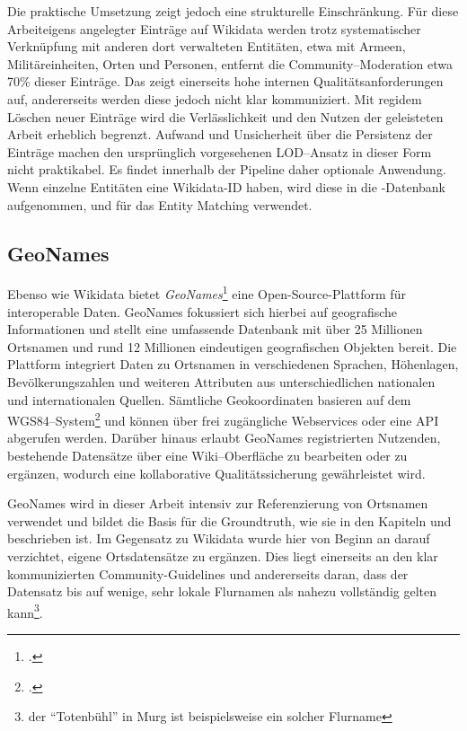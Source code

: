 \documentclass[12pt, a4paper, ngerman, bidi=default]{article}
\let\cite\footcite
\begin{document}
Die praktische Umsetzung zeigt jedoch eine strukturelle Einschränkung. Für diese Arbeiteigens angelegter Einträge auf Wikidata werden
trotz systematischer Verknüpfung mit anderen dort verwalteten Entitäten, etwa mit Armeen, Militäreinheiten, Orten und Personen, entfernt die Community–Moderation etwa 70\% dieser Einträge. 
Das zeigt einerseits hohe internen Qualitätsanforderungen auf, andererseits werden diese jedoch nicht klar kommuniziert. Mit regidem Löschen neuer Einträge wird die Verlässlichkeit und den Nutzen der 
geleisteten Arbeit erheblich begrenzt. 
Aufwand und Unsicherheit über die Persistenz der Einträge machen den ursprünglich vorgesehenen LOD–Ansatz in dieser Form nicht praktikabel. Es findet innerhalb der Pipeline daher optionale Anwendung. Wenn einzelne Entitäten eine Wikidata-ID haben, wird diese in die -Datenbank aufgenommen, und für das Entity Matching verwendet.

\subsection{GeoNames}\label{subsec:geonames}

Ebenso wie Wikidata bietet \textit{GeoNames}\cite[vgl.][]{noauthor_geonames_nodate} eine Open-Source-Plattform für interoperable Daten. GeoNames fokussiert sich hierbei auf geografische Informationen 
und stellt eine umfassende Datenbank mit über 25 Millionen Ortsnamen und rund 12 Millionen eindeutigen geografischen Objekten bereit.  
Die Plattform integriert Daten zu 
Ortsnamen in verschiedenen Sprachen, Höhenlagen, Bevölkerungszahlen und weiteren Attributen aus unterschiedlichen nationalen und internationalen Quellen.  
Sämtliche Geokoordinaten basieren auf dem WGS84–System\cite[\textit{WGS84: geodätische Grundlage des Global Positioning System (GPS)} ;vgl.][]{noauthor_wgs84_nodate}
und können über frei zugängliche Webservices oder eine API abgerufen werden.  
Darüber hinaus erlaubt GeoNames registrierten Nutzenden, bestehende Datensätze über eine Wiki–Oberfläche zu bearbeiten oder zu ergänzen, wodurch eine 
kollaborative Qualitätssicherung gewährleistet wird.

GeoNames wird in dieser Arbeit intensiv zur Referenzierung von Ortsnamen verwendet und bildet die Basis für die Groundtruth, wie sie in den Kapiteln  und 
 beschrieben ist. Im Gegensatz zu Wikidata wurde hier von Beginn an darauf verzichtet, eigene Ortsdatensätze zu ergänzen. Dies liegt einerseits an 
den klar kommunizierten Community-Guidelines und andererseits daran, dass der Datensatz bis auf wenige, sehr lokale Flurnamen als nahezu vollständig gelten kann\footnote{der \enquote{Totenbühl} in Murg ist beispielsweise ein solcher Flurname}.
\end{document}
